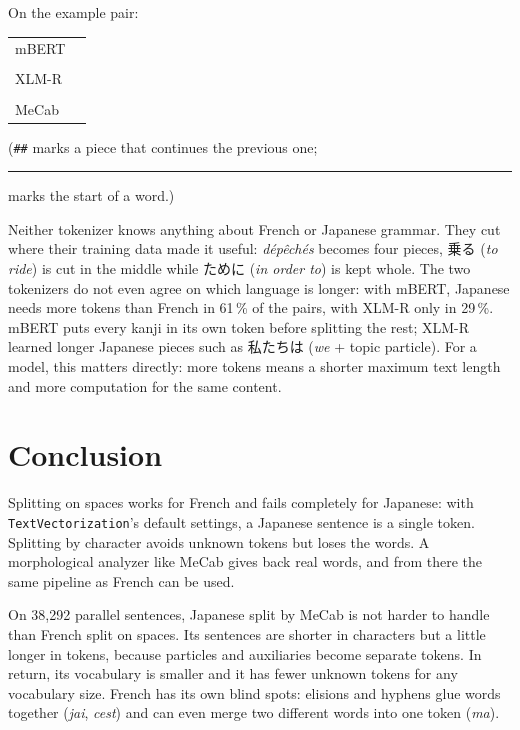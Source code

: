 \documentclass[11pt,a4paper]{article}
\makeatletter
\newcommand\wsp{\rule[-0.1ex]{0.45em}{0.5pt}}
\newcommand\code[1]{\texttt{#1}}
\newenvironment{result}
  {\par\smallskip\noindent\begin{tabular}{@{}l p{0.78\textwidth}@{}}}
  {\end{tabular}\par\smallskip}
\newcommand\row[2]{\textsf{\small\color{muted}#1} & #2 \\[3pt]}
\makeatother
\begin{document}
On the example pair:

\begin{result}
  \row{mBERT}{\tokens[fr]{Nous|nous|somme|\#\#s|dé|\#\#p|\#\#êché|\#\#s|pour|att|\#\#rap|\#\#er|le|bus|.}}
  \row{}{\tokens[ja]{私|たちは|\#\#バス|\#\#に|乗|る|\#\#ために|急|いだ|。}}
  \row{XLM-R}{\tokens[fr]{\wsp Nous|\wsp nous|\wsp sommes|\wsp dép|ê|ché|s|\wsp pour|\wsp att|ra|per|\wsp le|\wsp bus|.}}
  \row{}{\tokens[ja]{\wsp|私たちは|バス|に|乗|るために|急|い|だ|。}}
  \row{MeCab}{\tokens[ja]{私|たち|は|バス|に|乗る|ため|に|急い|だ|。}}
\end{result}

(\code{\#\#} marks a piece that continues the previous one; \wsp{} marks the
start of a word.)

Neither tokenizer knows anything about French or Japanese grammar. They cut
where their training data made it useful: \emph{dépêchés} becomes four pieces,
乗る (\emph{to ride}) is cut in the middle while ために (\emph{in order to})
is kept whole. The two tokenizers do not even agree on which language is
longer: with mBERT, Japanese needs more tokens than French in 61\,\% of the
pairs, with XLM-R only in 29\,\%. mBERT puts every kanji in its own token
before splitting the rest; XLM-R learned longer Japanese pieces such as
私たちは (\emph{we} + topic particle). For a model, this matters directly:
more tokens means a shorter maximum text length and more computation for the
same content.

\section{Conclusion}

Splitting on spaces works for French and fails completely for Japanese: with
\code{TextVectorization}'s default settings, a Japanese sentence is a single
token. Splitting by character avoids unknown tokens but loses the words. A
morphological analyzer like MeCab gives back real words, and from there the
same pipeline as French can be used.

On 38{,}292 parallel sentences, Japanese split by MeCab is not harder to
handle than French split on spaces. Its sentences are shorter in characters
but a little longer in tokens, because particles and auxiliaries become
separate tokens. In return, its vocabulary is smaller and it has fewer unknown
tokens for any vocabulary size. French has its own blind spots: elisions and
hyphens glue words together (\emph{jai}, \emph{cest}) and can even merge two
different words into one token (\emph{ma}).
\end{document}

